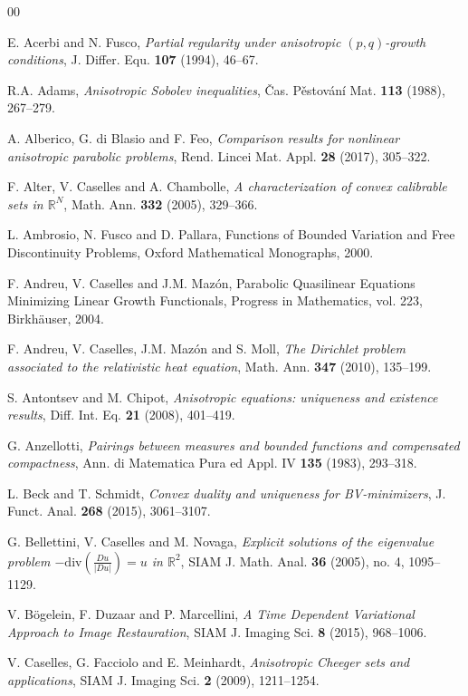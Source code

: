 \documentclass[reqno,12pt]{amsart}
\def\R{\mathbb R}
\numberwithin{equation}{section}
\begin{document}
\begin{thebibliography}{00}

 E. Acerbi and N. Fusco, {\it Partial regularity under anisotropic $(p,q)$-growth conditions}, J. Differ. Equ. {\bf 107} (1994), 46--67.

 R.A. Adams, {\it Anisotropic Sobolev inequalities}, \v{C}as. P\v{e}stov\'an\'i Mat. {\bf 113} (1988), 267--279.

 A. Alberico, G. di Blasio and F. Feo, {\it Comparison results for nonlinear anisotropic parabolic problems}, Rend. Lincei Mat. Appl. {\bf 28} (2017), 305--322.

 F. Alter, V. Caselles and A. Chambolle, {\it A characterization of convex calibrable sets in $\R^N$}, Math. Ann. {\bf 332} (2005), 329--366.

L. Ambrosio, N. Fusco and D. Pallara, Functions of Bounded Variation and Free Discontinuity Problems, Oxford Mathematical Monographs, 2000.

F. Andreu, V. Caselles and J.M. Maz\'on, Parabolic Quasilinear	Equations Minimizing Linear Growth Functionals, Progress in Mathematics, vol. 223, Birkh\"auser, 2004.

 F. Andreu, V. Caselles, J.M. Maz\'on and S. Moll, {\it The Dirichlet problem associated to the relativistic heat equation}, Math. Ann. {\bf 347} (2010), 135--199.

 S. Antontsev and M. Chipot, {\it Anisotropic equations: uniqueness and existence results}, Diff. Int. Eq. {\bf 21} (2008), 401--419. 

 G. Anzellotti, {\it Pairings between measures and bounded functions and compensated compactness}, Ann. di Matematica Pura ed Appl. IV {\bf 135} (1983), 293--318.
		
 L. Beck and T. Schmidt, {\it Convex duality and uniqueness for BV-minimizers}, J. Funct. Anal. {\bf 268} (2015), 3061--3107.

 G. Bellettini, V. Caselles and M. Novaga, {\it Explicit solutions of the eigenvalue problem $-\mathrm{div} (\frac{Du}{|Du|}) = u$ in $\R^2$}, SIAM J. Math. Anal. {\bf 36} (2005), no. 4, 1095--1129.

 V. B\"ogelein, F. Duzaar and P. Marcellini, {\it A Time Dependent Variational Approach to Image Restauration}, SIAM J. Imaging Sci. {\bf 8} (2015), 968--1006. 

 V. Caselles, G. Facciolo and E. Meinhardt, {\it Anisotropic Cheeger sets and applications}, SIAM J. Imaging Sci. {\bf 2} (2009), 1211--1254.


\end{thebibliography}
\end{document}
